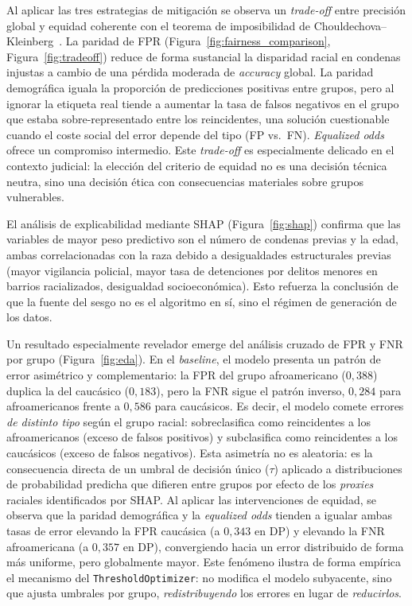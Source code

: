 \documentclass[11pt,a4paper]{article}
\begin{document}
Al aplicar las tres estrategias de mitigación se observa un \textit{trade-off} entre precisión global y equidad coherente con el teorema de imposibilidad de Chouldechova--Kleinberg~\cite{chouldechova2017fair, kleinberg2017inherent}. La paridad de FPR (Figura~\ref{fig:fairness_comparison}, Figura~\ref{fig:tradeoff}) reduce de forma sustancial la disparidad racial en condenas injustas a cambio de una pérdida moderada de \textit{accuracy} global. La paridad demográfica iguala la proporción de predicciones positivas entre grupos, pero al ignorar la etiqueta real tiende a aumentar la tasa de falsos negativos en el grupo que estaba sobre-representado entre los reincidentes, una solución cuestionable cuando el coste social del error depende del tipo (FP vs.\ FN). \textit{Equalized odds} ofrece un compromiso intermedio. Este \textit{trade-off} es especialmente delicado en el contexto judicial: la elección del criterio de equidad no es una decisión técnica neutra, sino una decisión ética con consecuencias materiales sobre grupos vulnerables.

El análisis de explicabilidad mediante SHAP (Figura~\ref{fig:shap}) confirma que las variables de mayor peso predictivo son el número de condenas previas y la edad, ambas correlacionadas con la raza debido a desigualdades estructurales previas (mayor vigilancia policial, mayor tasa de detenciones por delitos menores en barrios racializados, desigualdad socioeconómica). Esto refuerza la conclusión de que la fuente del sesgo no es el algoritmo en sí, sino el régimen de generación de los datos.

Un resultado especialmente revelador emerge del análisis cruzado de FPR y FNR por grupo (Figura~\ref{fig:eda}). En el \textit{baseline}, el modelo presenta un patrón de error asimétrico y complementario: la FPR del grupo afroamericano ($0{,}388$) duplica la del caucásico ($0{,}183$), pero la FNR sigue el patrón inverso, $0{,}284$ para afroamericanos frente a $0{,}586$ para caucásicos. Es decir, el modelo comete errores \emph{de distinto tipo} según el grupo racial: sobreclasifica como reincidentes a los afroamericanos (exceso de falsos positivos) y subclasifica como reincidentes a los caucásicos (exceso de falsos negativos). Esta asimetría no es aleatoria: es la consecuencia directa de un umbral de decisión único ($\tau$) aplicado a distribuciones de probabilidad predicha que difieren entre grupos por efecto de los \textit{proxies} raciales identificados por SHAP. Al aplicar las intervenciones de equidad, se observa que la paridad demográfica y la \textit{equalized odds} tienden a igualar ambas tasas de error elevando la FPR caucásica (a $0{,}343$ en DP) y elevando la FNR afroamericana (a $0{,}357$ en DP), convergiendo hacia un error distribuido de forma más uniforme, pero globalmente mayor. Este fenómeno ilustra de forma empírica el mecanismo del \texttt{ThresholdOptimizer}: no modifica el modelo subyacente, sino que ajusta umbrales por grupo, \emph{redistribuyendo} los errores en lugar de \emph{reducirlos}.
\end{document}
